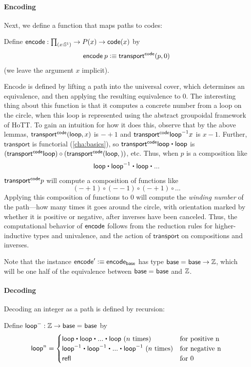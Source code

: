 \paragraph{Encoding}

Next, we define a function \encode that maps paths to codes:
\begin{defn}
Define $\encode : \prd{x : \Sn ^1} \rightarrow P(x) \rightarrow  \code(x)$ by 
\[
\mathsf{encode} \: p \vcentcolon\equiv \mathsf{transport}^{\mathsf{code}}(p,0)
\]
(we leave the argument $x$ implicit).  
\end{defn}
Encode is defined by lifting a path into the universal cover, which
determines an equivalence, and then applying the resulting equivalence
to $0$.  
The interesting thing about this function is that it computes a concrete
number from a loop on the circle, when this loop is represented using
the abstract groupoidal framework of HoTT.  To gain an
intuition for how it does this, observe that by the above lemmas,
$\mathsf{transport}^{\mathsf{code}}(\mathsf{loop},x)$ is $-+1$ and $\mathsf{transport}^{\mathsf{code}} {\mathord{{\mathsf{loop}}^{-1}}} x$ is $x - 1$.  Further, $\mathsf{transport}$ is functorial
(\autoref{cha:basics}), so $\transfibf{\code} {\lloop \ct \lloop}$ is
$(\mathsf{transport}^{\mathsf{code}} \mathsf{loop}) \circ (\mathsf{transport}^{\mathsf{code}}(\mathsf{loop},))$, etc.  Thus, when $p$ is a
composition like 
\[
\lloop \ct \opp \lloop \ct \lloop \ct ...
\]
$\mathsf{transport}^{\mathsf{code}}{p}$ will compute a composition of functions like
\[
(- + 1) \circ (- -1) \circ (- + 1) \circ ... 
\]
Applying this composition of functions to 0 will compute the
\emph{winding number} of the path---how many times it goes around the
circle, with orientation marked by whether it is positive or negative,
after inverses have been canceled.  Thus, the computational behavior of
$\mathsf{encode}$ follows from the reduction rules for higher-inductive types and
univalence, and the action of $\mathsf{transport}$ on compositions and inverses.

Note that the instance $\mathsf{encode}' \vcentcolon\equiv \mathsf{encode}_{\mathsf{base}}$ has type 
$\mathsf{base} =_{} \mathsf{base} \rightarrow \mathbb{Z}$, which will be one half of the
equivalence between $\mathsf{base} =_{} \mathsf{base}$ and $\mathbb{Z}$.  

\paragraph{Decoding}  

Decoding an integer as a path is defined by recursion:

\begin{defn}
Define $\mathsf{loop}^- : \mathbb{Z} \rightarrow \mathsf{base} =_{} \mathsf{base}$ by 
\[
\lloop^n = \begin{cases} \lloop \ct \lloop \ct ... \ct \lloop \text{ ($n$ times) } & \text{for positive n} \\
 \opp \lloop \ct \opp \lloop \ct ... \ct \opp \lloop \text{ ($n$ times)} & \text{for negative n} \\
  \refl{} & \text{for 0}  
\end{cases}
\]
\end{defn}

